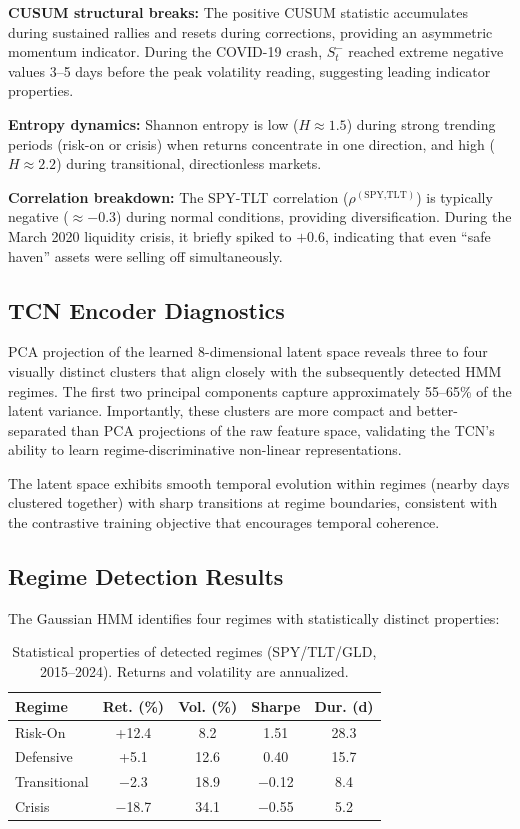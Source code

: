 \textbf{CUSUM structural breaks:} The positive CUSUM statistic accumulates during sustained rallies and resets during corrections, providing an asymmetric momentum indicator. During the COVID-19 crash, $S_t^{-}$ reached extreme negative values 3--5 days before the peak volatility reading, suggesting leading indicator properties.

\textbf{Entropy dynamics:} Shannon entropy is low ($H \approx 1.5$) during strong trending periods (risk-on or crisis) when returns concentrate in one direction, and high ($H \approx 2.2$) during transitional, directionless markets.

\textbf{Correlation breakdown:} The SPY-TLT correlation ($\rho^{(\text{SPY,TLT})}$) is typically negative ($\approx -0.3$) during normal conditions, providing diversification. During the March 2020 liquidity crisis, it briefly spiked to $+0.6$, indicating that even ``safe haven'' assets were selling off simultaneously.

\subsection{TCN Encoder Diagnostics}

PCA projection of the learned 8-dimensional latent space reveals three to four visually distinct clusters that align closely with the subsequently detected HMM regimes. The first two principal components capture approximately 55--65\% of the latent variance. Importantly, these clusters are more compact and better-separated than PCA projections of the raw feature space, validating the TCN's ability to learn regime-discriminative non-linear representations.

The latent space exhibits smooth temporal evolution within regimes (nearby days clustered together) with sharp transitions at regime boundaries, consistent with the contrastive training objective that encourages temporal coherence.

\subsection{Regime Detection Results}

The Gaussian HMM identifies four regimes with statistically distinct properties:

\begin{table}[t]
\centering
\caption{Statistical properties of detected regimes (SPY/TLT/GLD, 2015--2024). Returns and volatility are annualized.}
\label{tab:regimes}
\begin{tabular}{@{}lcccc@{}}
\toprule
\textbf{Regime} & \textbf{Ret. (\%)} & \textbf{Vol. (\%)} & \textbf{Sharpe} & \textbf{Dur. (d)} \\
\midrule
Risk-On       & +12.4 & 8.2  & 1.51  & 28.3 \\
Defensive     & +5.1  & 12.6 & 0.40  & 15.7 \\
Transitional  & $-$2.3  & 18.9 & $-$0.12 & 8.4 \\
Crisis        & $-$18.7 & 34.1 & $-$0.55 & 5.2 \\
\bottomrule
\end{tabular}
\end{table}

